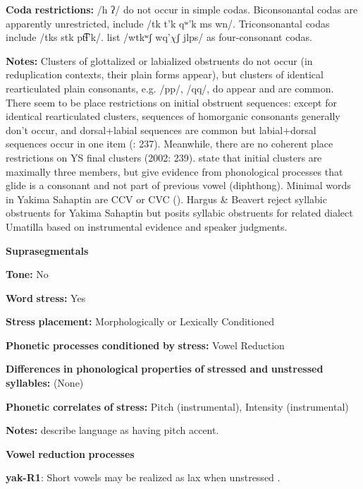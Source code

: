 \begin{styleBody}
\textbf{Coda} \textbf{restrictions:} /h ʔ/ do not occur in simple codas. Biconsonantal codas are apparently unrestricted, include /tk t’k qʷ'k ms wn/. Triconsonantal codas include /tks stk pt͡ɬ’k/. \citet{HargusBeavert2006} list /wtkʷʃ wq’$\chi ʃ$ jlps/ as four-consonant codas.

\textbf{Notes:} Clusters of glottalized or labialized obstruents do not occur (in reduplication contexts, their plain forms appear), but clusters of identical rearticulated plain consonants, e.g. /pp/, /qq/, do appear and are common. There seem to be place restrictions on initial obstruent sequences: except for identical rearticulated clusters, sequences of homorganic consonants generally don’t occur, and dorsal+labial sequences are common but labial+dorsal sequences occur in one item (\citealt{HargusBeavert2002}: 237). Meanwhile, there are no coherent place restrictions on YS final clusters (2002: 239). \citet{RigsbyRude1996} state that initial clusters are maximally three members, but \citet{HargusBeavert2006} give evidence from phonological processes that glide is a consonant and not part of previous vowel (diphthong). Minimal words in Yakima Sahaptin are CCV or CVC (\citealt{HargusBeavert2006}). Hargus \& Beavert reject syllabic obstruents for Yakima Sahaptin but \citet{Minthorn2005} posits syllabic obstruents for related dialect Umatilla based on instrumental evidence and speaker judgments.

\textbf{Suprasegmentals}

\textbf{Tone:} No

\textbf{Word} \textbf{stress:} Yes

\textbf{Stress} \textbf{placement:} Morphologically or Lexically Conditioned

\textbf{Phonetic} \textbf{processes} \textbf{conditioned} \textbf{by} \textbf{stress:} Vowel Reduction

\textbf{Differences} \textbf{in} \textbf{phonological} \textbf{properties} \textbf{of} \textbf{stressed} \textbf{and} \textbf{unstressed} \textbf{syllables:} (None)

\textbf{Phonetic} \textbf{correlates} \textbf{of} \textbf{stress:} Pitch (instrumental), Intensity (instrumental)

\textbf{Notes:} \citet{HargusBeavert2005} describe language as having pitch accent.

\textbf{Vowel} \textbf{reduction} \textbf{processes}

\textbf{yak-R1}: Short vowels may be realized as lax when unstressed \citep[40]{Jansen2010}.


\end{styleBody}
